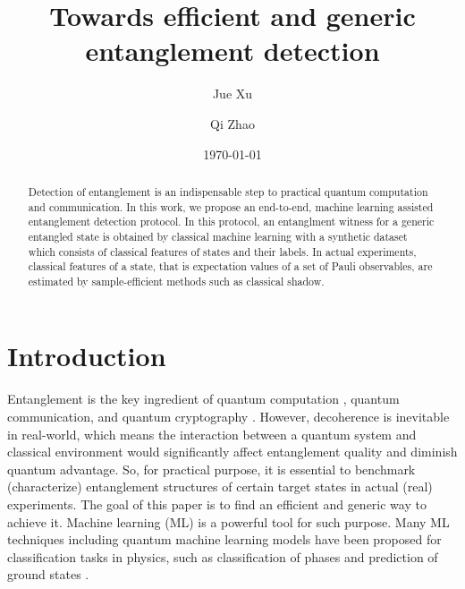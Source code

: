 \documentclass[
reprint,
aps,
pra,
floatfix,
]{revtex4-2}
\theoremstyle{plain}
\theoremstyle{definition}
\begin{document}
\title{Towards efficient and generic entanglement detection}
\author{Jue Xu}
\author{Qi Zhao}
\date{\today}
\begin{abstract}
	Detection of entanglement is an indispensable step to practical quantum computation and communication.
	In this work, we propose an end-to-end, machine learning assisted entanglement detection protocol.
	In this protocol, an entanglment witness for a generic entangled state is obtained by classical machine learning with a synthetic dataset which consists of classical features of states and their labels. 
	In actual experiments, classical features of a state, that is expectation values of a set of  Pauli observables, are estimated by sample-efficient methods such as classical shadow.
\end{abstract}

\maketitle

\section{Introduction}
Entanglement \cite{horodeckiQuantumEntanglement2009} is the key ingredient of quantum computation \cite{briegelMeasurementbasedQuantumComputation2009}, quantum communication, and quantum cryptography \cite{xuSecureQuantumKey2020}.
However, decoherence is inevitable in real-world, which means the interaction between a quantum system and classical environment would significantly affect entanglement quality and diminish quantum advantage. 
So, for practical purpose, it is essential to benchmark (characterize) entanglement structures of certain target states in actual (real) experiments.
The goal of this paper is to find an efficient and generic way to achieve it. 
Machine learning (ML) is a powerful tool for such purpose. 
Many ML techniques including quantum machine learning models \cite{congQuantumConvolutionalNeural2019} have been proposed for classification tasks in physics, such as classification of phases and prediction of ground states \cite{carrasquillaMachineLearningPhases2017} \cite{huangProvablyEfficientMachine2022}.
\end{document}
